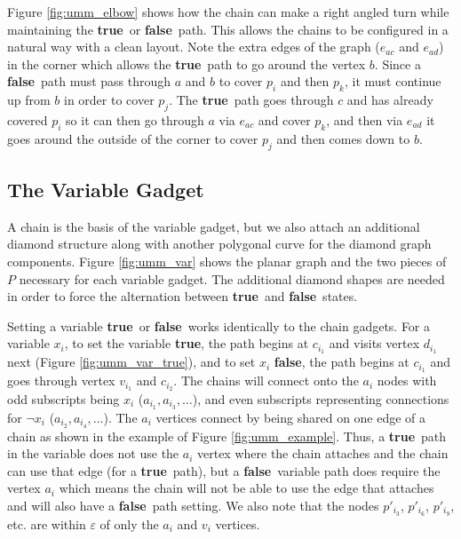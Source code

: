 \documentclass{article}[11pt]
\newcommand{\true}{\textbf{true}}
\newcommand{\false}{\textbf{false}}
\begin{document}
Figure \ref{fig:umm_elbow} shows how the chain can make a right angled turn 
while maintaining the \true\ or \false\ path.  This allows the chains to be configured in a natural way with a 
clean layout. Note the extra edges of the graph ($e_{ac}$ and $e_{ad}$) in the corner which allows
the \true\ path to go around the vertex $b$. Since a \false\ path must pass through
$a$ and $b$ to cover $p_i$ and then $p_{k}$, it must continue up from $b$ in order to cover $p_j$. 
The \true\ path goes through $c$ and has already covered $p_i$ so it can then go 
through $a$ via $e_{ac}$ and cover $p_k$, and then via $e_{ad}$ it goes around the
outside of the corner to cover $p_j$ and then comes down to $b$. 





\subsection{The Variable Gadget}
A chain is the basis of the variable gadget, but we also attach an additional 
diamond structure along with another polygonal curve for the diamond graph components.
Figure \ref{fig:umm_var} shows the planar graph and the two pieces of $P$ 
necessary for each variable gadget.   
The additional diamond shapes are needed in order to force the
alternation between \true\ and \false\ states.  

Setting a variable \true\ or \false\ works identically to the chain gadgets. 
For a variable $x_i$, to set the variable \true, the path begins at $c_{i_1}$ and 
visits vertex $d_{i_1}$ next (Figure \ref{fig:umm_var_true}), and to set $x_i$
\false, the path begins at $c_{i_1}$ and goes through vertex $v_{i_1}$ and
$c_{i_2}$.  The chains will connect onto the $a_i$ nodes with odd subscripts 
being $x_i$ ($a_{i_1},a_{i_3},\dots$), and even subscripts representing connections
for $\lnot x_i$ ($a_{i_2}, a_{i_4},\dots$).  The $a_i$ vertices connect by being
shared on one edge of a chain as shown in the example of Figure \ref{fig:umm_example}.
Thus, a \true\ path in the variable does not use the $a_i$ vertex where the chain attaches
and the chain can use that edge (for a \true\ path), but
a \false\ variable path does require the vertex $a_i$ which means the chain will not be able to
use the edge that attaches and will also have a \false\ path setting.
We also note that the nodes $p'_{i_3}$, $p'_{i_6}$, $p'_{i_9}$, etc. are within $\varepsilon$ of 
only the $a_i$ and $v_i$ vertices.
\end{document}
